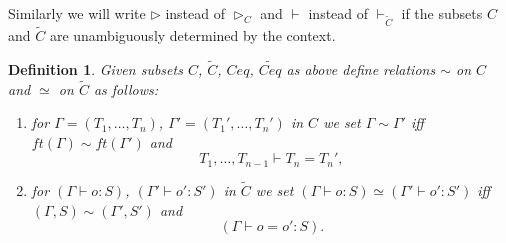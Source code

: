 \documentclass[11pt]{article}
\newtheorem{definition}[proposition]{Definition}
\newcommand{\llabel}[1]{\label{#1}}
\newcommand{\wt}{\widetilde}
\begin{document}
Similarly we will write $\rhd$ instead of $\rhd_C$ and $\vdash$ instead of $\vdash_{\wt{C}}$ if the subsets $C$ and $\wt{C}$ are unambiguously  determined by the context.  

%
\begin{definition}
\llabel{simandsimeq}
Given subsets $C$, $\wt{C}$, $Ceq$, $\wt{Ceq}$ as above define relations $\sim$ on $C$ and $\simeq$ on $\wt{C}$ as follows:
%
\begin{enumerate}
\item for $\Gamma=(T_1,\dots,T_n)$, $\Gamma'=(T_1',\dots,T_n')$ in $C$ we set  $\Gamma\sim\Gamma'$ iff $ft(\Gamma)\sim ft(\Gamma')$ and 
%
$$T_1,\dots,T_{n-1}\vdash T_n=T_n',$$
\item for $(\Gamma\vdash o:S)$, $(\Gamma'\vdash o':S')$ in $\wt{C}$ we set $(\Gamma\vdash o:S)\simeq(\Gamma'\vdash o':S')$ iff $(\Gamma,S)\sim(\Gamma',S')$ and 
%
$$(\Gamma\vdash o=o':S).$$
\end{enumerate}
\end{definition}
%
\end{document}

